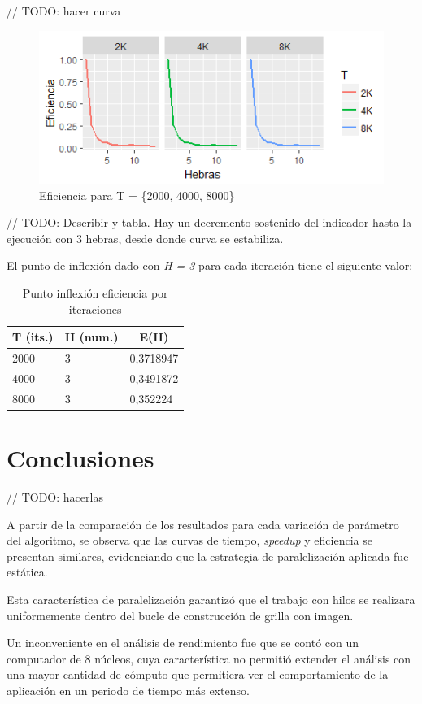 \documentclass[jou]{apa6}
\begin{document}
// TODO: hacer curva
\begin{figure}[h]
	\includegraphics[width=\columnwidth]{time-diff-block-size-no-raw.png}
	\caption{Eficiencia para T = \{2000, 4000, 8000\}}
	\label{fig:Figure3}
\end{figure}

// TODO: Describir y tabla.
Hay un decremento sostenido del indicador hasta la ejecución con 3 hebras, desde donde curva se estabiliza.

El punto de inflexión dado con \textit{H = 3} para cada iteración tiene el siguiente valor:

\begin{table}[]
\centering
\caption{Punto inflexión eficiencia por iteraciones}
\label{my-label}
\begin{tabular}{@{}lll@{}}
\toprule
\multicolumn{1}{c}{T (its.)} & \multicolumn{1}{c}{H (num.)} & \multicolumn{1}{c}{E(H)} \\ \midrule
2000                         & 3                            & 0,3718947                \\
4000                         & 3                            & 0,3491872                \\
8000                         & 3                            & 0,352224                 \\ \bottomrule
\end{tabular}
\end{table}

\section{Conclusiones}
// TODO: hacerlas

A partir de la comparación de los resultados para cada variación de parámetro del algoritmo, se observa que las curvas de tiempo, \textit{speedup} y eficiencia se presentan similares, evidenciando que la estrategia de paralelización aplicada fue estática. 

Esta característica de paralelización garantizó que el trabajo con hilos se realizara uniformemente dentro del bucle de construcción de grilla con imagen.

Un inconveniente en el análisis de rendimiento fue que se contó con un computador de 8 núcleos, cuya característica no permitió extender el análisis con una mayor cantidad de cómputo que permitiera ver el comportamiento de la aplicación en un periodo de tiempo más extenso.
\end{document}
